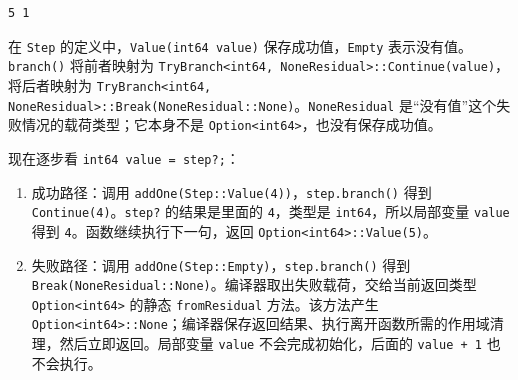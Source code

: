 \par
\medskip
\begin{lstlisting}[style=out]
5 1
\end{lstlisting}
\par
\medskip

在 \texttt{Step} 的定义中，\texttt{Value(\allowbreak{}int64 value)\allowbreak{}} 保存成功值，\texttt{Empty} 表示没有值。\texttt{branch(\allowbreak{})\allowbreak{}} 将前者映射为 \texttt{Try\allowbreak{}Branch<\allowbreak{}int64,\allowbreak{} None\allowbreak{}Residual>\allowbreak{}:\allowbreak{}:\allowbreak{}Continue(\allowbreak{}value)\allowbreak{}}，将后者映射为 \texttt{Try\allowbreak{}Branch<\allowbreak{}int64,\allowbreak{} None\allowbreak{}Residual>\allowbreak{}:\allowbreak{}:\allowbreak{}Break(\allowbreak{}None\allowbreak{}Residual:\allowbreak{}:\allowbreak{}None)\allowbreak{}}。\texttt{None\allowbreak{}Residual} 是“没有值”这个失败情况的载荷类型；它本身不是 \texttt{Option<\allowbreak{}int64>\allowbreak{}}，也没有保存成功值。

现在逐步看 \texttt{int64 value =\allowbreak{} step?;}：

\begin{enumerate}

\item 成功路径：调用 \texttt{add\allowbreak{}One(\allowbreak{}Step:\allowbreak{}:\allowbreak{}Value(\allowbreak{}4)\allowbreak{})\allowbreak{}}，\texttt{step.\allowbreak{}branch(\allowbreak{})\allowbreak{}} 得到 \texttt{Continue(\allowbreak{}4)\allowbreak{}}。\texttt{step?} 的结果是里面的 \texttt{4}，类型是 \texttt{int64}，所以局部变量 \texttt{value} 得到 \texttt{4}。函数继续执行下一句，返回 \texttt{Option<\allowbreak{}int64>\allowbreak{}:\allowbreak{}:\allowbreak{}Value(\allowbreak{}5)\allowbreak{}}。

\item 失败路径：调用 \texttt{add\allowbreak{}One(\allowbreak{}Step:\allowbreak{}:\allowbreak{}Empty)\allowbreak{}}，\texttt{step.\allowbreak{}branch(\allowbreak{})\allowbreak{}} 得到 \texttt{Break(\allowbreak{}None\allowbreak{}Residual:\allowbreak{}:\allowbreak{}None)\allowbreak{}}。编译器取出失败载荷，交给当前返回类型 \texttt{Option<\allowbreak{}int64>\allowbreak{}} 的静态 \texttt{from\allowbreak{}Residual} 方法。该方法产生 \texttt{Option<\allowbreak{}int64>\allowbreak{}:\allowbreak{}:\allowbreak{}None}；编译器保存返回结果、执行离开函数所需的作用域清理，然后立即返回。局部变量 \texttt{value} 不会完成初始化，后面的 \texttt{value + 1} 也不会执行。

\end{enumerate}

